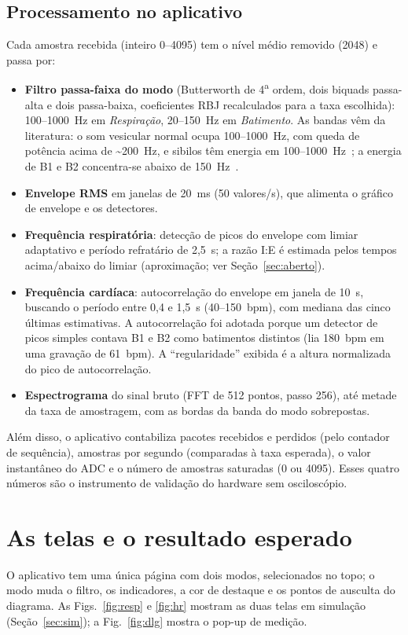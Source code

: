 \documentclass[conference,a4paper]{IEEEtran}
\begin{document}
\subsection{Processamento no aplicativo}
Cada amostra recebida (inteiro 0--4095) tem o nível médio removido (2048) e passa por:
\begin{itemize}[leftmargin=*]
\item \textbf{Filtro passa-faixa do modo} (Butterworth de 4\textsuperscript{a} ordem, dois biquads passa-alta e dois passa-baixa, coeficientes RBJ recalculados para a taxa escolhida): 100--1000~Hz em \emph{Respiração}, 20--150~Hz em \emph{Batimento}. As bandas vêm da literatura: o som vesicular normal ocupa 100--1000~Hz, com queda de potência acima de \textasciitilde200~Hz, e sibilos têm energia em 100--1000~Hz~\cite{bohadana2014,kim2023}; a energia de B1 e B2 concentra-se abaixo de 150~Hz~\cite{arnott1984}.
\item \textbf{Envelope RMS} em janelas de 20~ms (50 valores/s), que alimenta o gráfico de envelope e os detectores.
\item \textbf{Frequência respiratória}: detecção de picos do envelope com limiar adaptativo e período refratário de 2,5~s; a razão I:E é estimada pelos tempos acima/abaixo do limiar (aproximação; ver Seção~\ref{sec:aberto}).
\item \textbf{Frequência cardíaca}: autocorrelação do envelope em janela de 10~s, buscando o período entre 0,4 e 1,5~s (40--150~bpm), com mediana das cinco últimas estimativas. A autocorrelação foi adotada porque um detector de picos simples contava B1 e B2 como batimentos distintos (lia 180~bpm em uma gravação de 61~bpm). A ``regularidade'' exibida é a altura normalizada do pico de autocorrelação.
\item \textbf{Espectrograma} do sinal bruto (FFT de 512 pontos, passo 256), até metade da taxa de amostragem, com as bordas da banda do modo sobrepostas.
\end{itemize}
Além disso, o aplicativo contabiliza pacotes recebidos e perdidos (pelo contador de sequência), amostras por segundo (comparadas à taxa esperada), o valor instantâneo do ADC e o número de amostras saturadas (0 ou 4095). Esses quatro números são o instrumento de validação do hardware sem osciloscópio.

\section{As telas e o resultado esperado}
O aplicativo tem uma única página com dois modos, selecionados no topo; o modo muda o filtro, os indicadores, a cor de destaque e os pontos de ausculta do diagrama. As Figs.~\ref{fig:resp} e \ref{fig:hr} mostram as duas telas em simulação (Seção~\ref{sec:sim}); a Fig.~\ref{fig:dlg} mostra o pop-up de medição.
\end{document}
